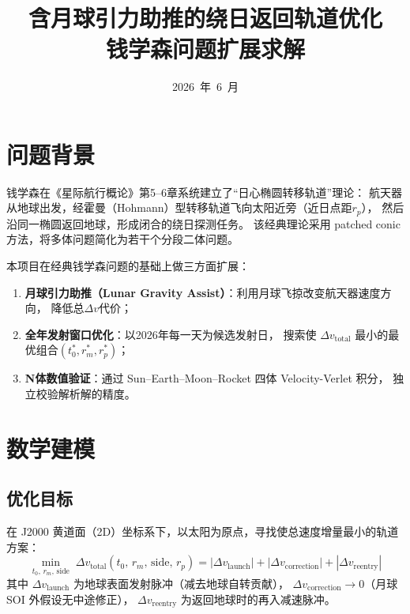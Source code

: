 \documentclass[a4paper,12pt]{article}
\title{\textbf{含月球引力助推的绕日返回轨道优化} \\[0.5em]
  \large 钱学森问题扩展求解}
\author{}
\date{2026~年~6~月}
\begin{document}
\maketitle
\thispagestyle{fancy}
\tableofcontents
\newpage

\section{问题背景}\label{sec:background}

钱学森在《星际航行概论》第5--6章系统建立了``日心椭圆转移轨道''理论：
航天器从地球出发，经霍曼（Hohmann）型转移轨道飞向太阳近旁（近日点距$r_p$），
然后沿同一椭圆返回地球，形成闭合的绕日探测任务。
该经典理论采用 patched conic 方法，将多体问题简化为若干个分段二体问题。

本项目在经典钱学森问题的基础上做三方面扩展：
\begin{enumerate}[label=(\arabic*)]
  \item \textbf{月球引力助推（Lunar Gravity Assist）}：利用月球飞掠改变航天器速度方向，
        降低总$\Delta v$代价；
  \item \textbf{全年发射窗口优化}：以2026年每一天为候选发射日，
        搜索使 $\Delta v_{\mathrm{total}}$ 最小的最优组合$(t_0^*, r_m^*, r_p^*)$；
  \item \textbf{N体数值验证}：通过 Sun--Earth--Moon--Rocket 四体 Velocity-Verlet 积分，
        独立校验解析解的精度。
\end{enumerate}


\section{数学建模}\label{sec:model}

\subsection{优化目标}

在 J2000 黄道面（2D）坐标系下，以太阳为原点，寻找使总速度增量最小的轨道方案：
\begin{equation}\label{eq:objective}
  \min_{t_0,\, r_m,\, \mathrm{side}} \;
  \Delta v_{\mathrm{total}}(t_0,\, r_m,\, \mathrm{side},\, r_p)
  = |\Delta v_{\mathrm{launch}}| + |\Delta v_{\mathrm{correction}}| + |\Delta v_{\mathrm{reentry}}|
\end{equation}
其中 $\Delta v_{\mathrm{launch}}$ 为地球表面发射脉冲（减去地球自转贡献），
$\Delta v_{\mathrm{correction}} \to 0$（月球 SOI 外假设无中途修正），
$\Delta v_{\mathrm{reentry}}$ 为返回地球时的再入减速脉冲。
\end{document}
